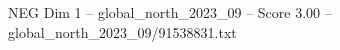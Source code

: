 \begin{textsample}{NEG Dim 1 – global\_north\_2023\_09 – Score 3.00 – global\_north\_2023\_09/91538831.txt}
\end{textsample}
